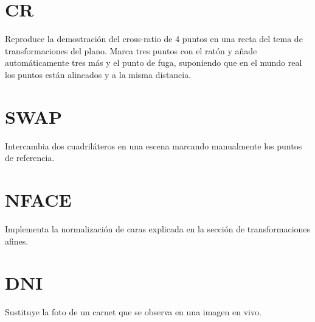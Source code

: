 \documentclass[a4paper]{article} %
\begin{document}
\newpage


\section{CR}
\bigskip

\begin{tcolorbox}[breakable,notitle,boxrule=0pt,colback=lightgray,colframe=lightgray]
	Reproduce la demostración del cross-ratio de 4 puntos en una recta del tema de transformaciones del plano. Marca tres puntos con el ratón y añade automáticamente tres más y el punto de fuga, suponiendo que en el mundo real los puntos están alineados y a la misma distancia.
\end{tcolorbox}

\newpage


\section{SWAP}
\bigskip

\begin{tcolorbox}[breakable,notitle,boxrule=0pt,colback=lightgray,colframe=lightgray]
	Intercambia dos cuadriláteros en una escena marcando manualmente los puntos de referencia.
\end{tcolorbox}

\newpage


\section{NFACE}
\bigskip

\begin{tcolorbox}[breakable,notitle,boxrule=0pt,colback=lightgray,colframe=lightgray]
	Implementa la normalización de caras explicada en la sección de transformaciones afines.
\end{tcolorbox}

\newpage


\section{DNI}
\bigskip

\begin{tcolorbox}[breakable,notitle,boxrule=0pt,colback=lightgray,colframe=lightgray]
	Sustituye la foto de un carnet que se observa en una imagen en vivo.
\end{tcolorbox}
\end{document}

